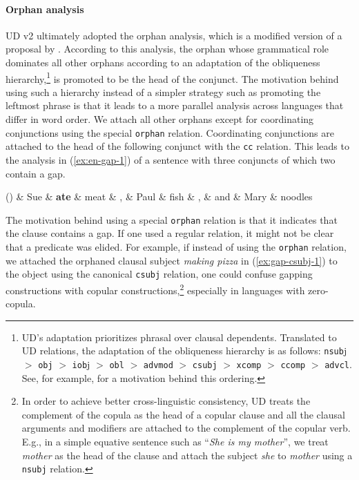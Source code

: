 \documentclass[lucida,biblatex]{sp} %
\newcounter{excounter}
\begin{document}
\paragraph{Orphan analysis}
UD v2 ultimately adopted the {\sc orphan} analysis, which is a modified version of a proposal by \citet{Gerdes2015}. According to this analysis, the orphan 
whose grammatical role dominates all other orphans according to an adaptation of the 
obliqueness hierarchy,\footnote{
UD's adaptation prioritizes phrasal over clausal dependents. 
Translated to UD relations, the adaptation of the obliqueness 
hierarchy is as follows: \texttt{nsub}j $>$ \texttt{obj} $>$ \texttt{iob}j $>$ \texttt{obl} $>$ 
\texttt{advmod} $>$ \texttt{csubj} $>$ \texttt{xcomp} $>$ \texttt{ccomp} $>$ \texttt{advcl}. 
See, for example, \citet{Pollard1994} for a motivation behind this ordering.} is promoted to be the 
head of the conjunct. The motivation behind using such a hierarchy instead of 
a simpler strategy such as promoting the leftmost phrase is that it leads 
to a more parallel analysis across languages that differ in word order.
We attach all other orphans except for coordinating conjunctions 
using the special \texttt{orphan} relation. Coordinating conjunctions are attached to the 
head of the following conjunct with the \texttt{cc} relation. This leads to the analysis 
in (\ref{ex:en-gap-1}) of a sentence with three conjuncts of which two contain a gap.

\begin{center}
  \label{ex:en-gap-1}
  \footnotesize
  \begin{dependency}
    \begin{deptext}[column sep=0.1cm]
      (\theexcounter)
       \& Sue \& \textbf{ate} \& meat \& , \& Paul \& fish \& , \& and \& Mary \& noodles \\
    \end{deptext}
  \end{dependency}
\end{center}

The motivation behind using a special \texttt{orphan} relation 
is that it indicates that the clause contains a gap.
If one used a regular relation, it might not be clear that a predicate was elided. 
For example, if instead of using the {\tt orphan} relation, we attached the
 orphaned clausal subject {\it making pizza} in (\ref{ex:gap-csubj-1}) to the object using
 the canonical {\tt csubj} relation, one could confuse gapping constructions with copular constructions,\footnote{In order to achieve better cross-linguistic consistency, UD treats the complement of the copula as the head of a copular clause and  all the clausal arguments and modifiers are attached to the complement of the copular verb. E.g., in a simple equative sentence such as ``{\it She is my mother}'', we treat {\it mother}  as the head of the clause and attach the subject {\it she} to {\it mother} using a {\tt nsubj} relation.}
 especially in languages with zero-copula.
\end{document}
